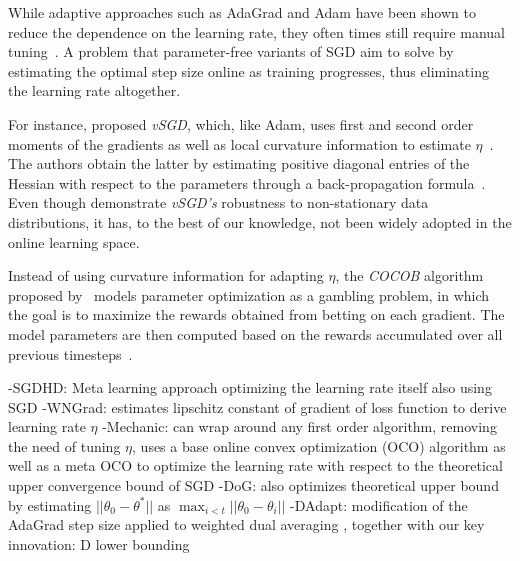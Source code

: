 \documentclass[letterpaper]{article} %
\begin{document}
While adaptive approaches such as AdaGrad and Adam have been shown to reduce the dependence on the learning rate, they often times still require manual tuning~\cite{wuWNGradLearnLearning2020}.
A problem that parameter-free variants of SGD aim to solve by estimating the optimal step size online as training progresses, thus eliminating the learning rate altogether.

For instance, \citet{schaulNoMorePesky2013} proposed \textit{vSGD}, which, like Adam, uses first and second order moments of the gradients as well as local curvature information to estimate $\eta$~\cite{schaulNoMorePesky2013}.
The authors obtain the latter by estimating positive diagonal entries of the Hessian with respect to the parameters through a back-propagation formula~\cite{schaulNoMorePesky2013}.
Even though \citet{schaulNoMorePesky2013} demonstrate \textit{vSGD's} robustness to non-stationary data distributions, it has, to the best of our knowledge, not been widely adopted in the online learning space.

Instead of using curvature information for adapting $\eta$, the \textit{COCOB} algorithm proposed by~\citet{orabonaTrainingDeepNetworks2017} models parameter optimization as a gambling problem, in which the goal is to maximize the rewards obtained from betting on each gradient.
The model parameters are then computed based on the rewards accumulated over all previous timesteps~\cite{orabonaTrainingDeepNetworks2017}.

-SGDHD: Meta learning approach optimizing the learning rate itself also using SGD
-WNGrad: estimates lipschitz constant of gradient of loss function to derive learning rate $\eta$
-Mechanic: can wrap around any first order algorithm, removing the need of tuning $\eta$, uses a base online convex optimization (OCO) algorithm as well as a meta OCO to optimize the learning rate with respect to the theoretical upper convergence bound of SGD
-DoG: also optimizes theoretical upper bound by estimating $||\theta_0 - \theta^*||$ as $\max_{i<t}||\theta_0 - \theta_i||$
-DAdapt: modification of the AdaGrad step size applied to weighted dual averaging \cite{duchiDualAveragingDistributed2012}, together with our key innovation: D lower bounding
\end{document}
